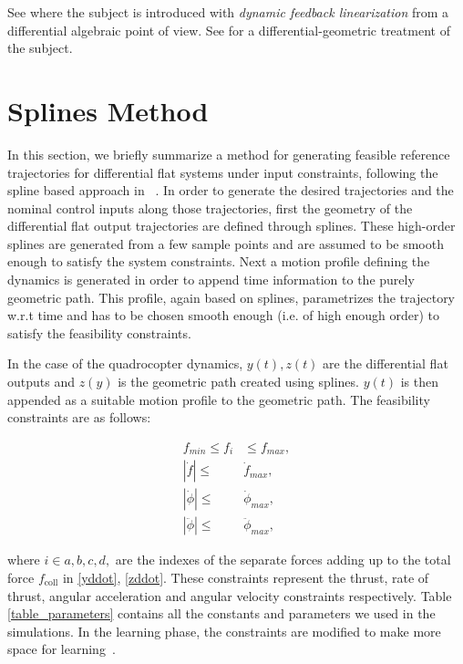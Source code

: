 See \cite{Fliess95} where the subject is introduced with \emph{dynamic feedback linearization} from a differential algebraic point of view. See \cite{Rathinam97} for a differential-geometric treatment of the subject.

\section{Splines Method}
\label{Splines}

In this section, we briefly summarize a method for generating feasible reference trajectories for differential flat systems under input constraints, following the spline based approach in ~\cite{ILC_Angela,Zhang}. In order to generate the desired trajectories and the nominal control inputs along those trajectories, first the geometry of the differential flat output trajectories are defined through splines. These high-order splines are generated from a few sample points and are assumed to be smooth enough to satisfy the system constraints. Next a motion profile defining the dynamics is generated in order to append time information to the purely geometric path. This profile, again based on splines, parametrizes the trajectory w.r.t time and has to be chosen smooth enough (i.e. of high enough order) to satisfy the feasibility constraints.

In the case of the quadrocopter dynamics, $y(t), z(t)$ are the differential flat outputs and $z(y)$ is the geometric path created using splines. $y(t)$ is then appended as a suitable motion profile to the geometric path. The feasibility constraints are as follows:

\begin{align}
f_{min} \leq f_i &\leq f_{max}, \label{thrust_constraints} \\
|\dot{f}| \leq &\dot{f}_{max}, \label{thrust_rate_constraints} \\
|\dot{\phi}| \leq &\dot{\phi}_{max}, \label{angular_acc_constraints} \\
|\ddot{\phi}| \leq &\ddot{\phi}_{max}, \label{angular_vel_constraints}
\end{align}

where $i \in{a,b,c,d}, $ are the indexes of the separate forces adding up to the total force $f_{\mathrm{coll}}$ in \eqref{yddot}, \eqref{zddot}. These constraints represent the thrust, rate of thrust, angular acceleration and angular velocity constraints respectively. Table \ref{table_parameters} contains all the constants and parameters we used in the simulations. In the learning phase, the constraints are modified to make more space for learning~\cite{ILC_Angela}. 

